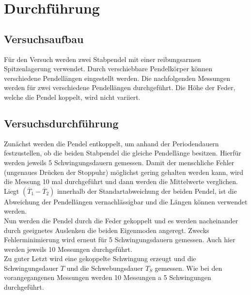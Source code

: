 \section{Durchführung}
\label{sec:Durchführung}

\subsection{Versuchsaufbau}
    Für den Versuch werden zwei Stabpendel mit einer reibungsarmen Spitzenlagerung verwendet. Durch verschiebbare
    Pendelkörper können verschiedene Pendellängen eingestellt werden. Die nachfolgenden 
    Messungen werden für zwei verschiedene Pendellängen durchgeführt. Die Höhe der Feder, 
    welche die Pendel koppelt, wird nicht variiert.
\subsection{Versuchsdurchführung}
    Zunächst werden die Pendel entkoppelt, um anhand der Periodendauern festzustellen,
    ob die beiden Stabpendel die gleiche Pendellänge besitzen. Hierfür werden jeweils 5 
    Schwingungsdauern gemessen. Damit der menschliche Fehler (ungenaues Drücken der Stoppuhr) 
    möglichst gering gehalten werden kann, wird die Messung 10 mal durchgeführt und dann 
    werden die Mittelwerte verglichen. Liegt $(\overline T_1-\overline T_2)$ innerhalb der 
    Standartabweichung der beiden Pendel, ist die Abweichung der Pendellängen vernachlässigbar 
    und die Längen können verwendet werden. \\
    Nun werden die Pendel durch die Feder gekoppelt und es werden nacheinander durch 
    geeignetes Auslenken die beiden Eigenmoden angeregt. Zwecks Fehlerminimierung wird 
    erneut für 5 Schwingungsdauern gemessen. Auch hier werden jeweils 10 Messungen durchgeführt.\\
    Zu guter Letzt wird eine gekoppelte Schwingung erzeugt und die Schwingungsdauer $T$ und 
    die Schwebungsdauer $T_S$ gemessen. Wie bei den vorangegangenen Messungen werden 10 Messungen a 5 
    Schwingungen durchgeführt.